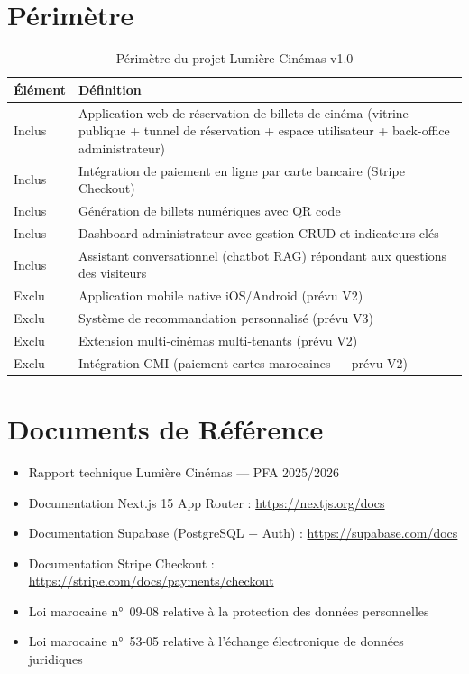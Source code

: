\documentclass[12pt,a4paper,openany]{report}
\begin{document}
\section{Périmètre}

\begin{table}[H]
\centering
\begin{tabularx}{\textwidth}{lX}
\toprule
\textbf{Élément} & \textbf{Définition} \\
\midrule
Inclus & Application web de réservation de billets de cinéma (vitrine publique + tunnel de réservation + espace utilisateur + back-office administrateur) \\
Inclus & Intégration de paiement en ligne par carte bancaire (Stripe Checkout) \\
Inclus & Génération de billets numériques avec QR code \\
Inclus & Dashboard administrateur avec gestion CRUD et indicateurs clés \\
Inclus & Assistant conversationnel (chatbot RAG) répondant aux questions des visiteurs \\
Exclu  & Application mobile native iOS/Android (prévu V2) \\
Exclu  & Système de recommandation personnalisé (prévu V3) \\
Exclu  & Extension multi-cinémas multi-tenants (prévu V2) \\
Exclu  & Intégration CMI (paiement cartes marocaines — prévu V2) \\
\bottomrule
\end{tabularx}
\caption{Périmètre du projet Lumière Cinémas v1.0}
\end{table}

\section{Documents de Référence}

\begin{itemize}
  \item Rapport technique Lumière Cinémas — PFA 2025/2026
  \item Documentation Next.js 15 App Router : \url{https://nextjs.org/docs}
  \item Documentation Supabase (PostgreSQL + Auth) : \url{https://supabase.com/docs}
  \item Documentation Stripe Checkout : \url{https://stripe.com/docs/payments/checkout}
  \item Loi marocaine n°~09-08 relative à la protection des données personnelles
  \item Loi marocaine n°~53-05 relative à l'échange électronique de données juridiques
\end{itemize}
\end{document}
